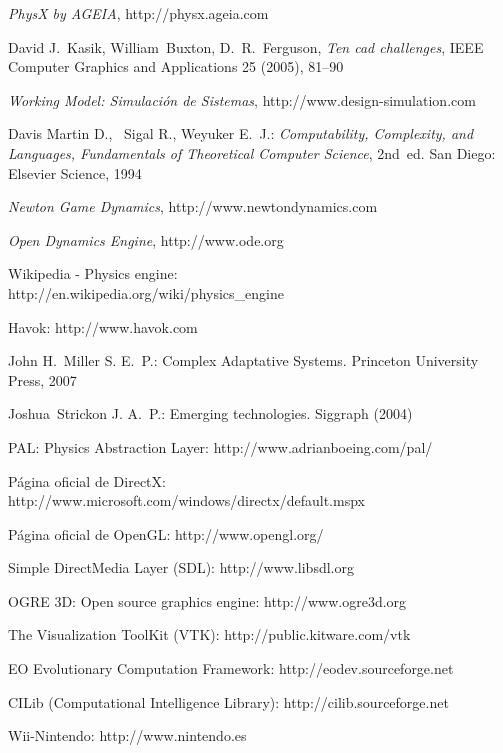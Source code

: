 \documentclass[10pt,journal,letterpaper,compsoc]{IEEEtran}
\begin{document}
\begin{thebibliography}{28}

\emph{PhysX by AGEIA},
http://physx.ageia.com

David J.~Kasik, William~Buxton, D.~R.~Ferguson,
\emph{Ten cad challenges},
IEEE Computer Graphics and Applications 25 (2005), 81--90

\emph{Working Model: Simulaci\'on de Sistemas},
http://www.design-simulation.com

Davis Martin D., ~Sigal R., Weyuker E.~J.:
\emph{Computability, Complexity, and Languages, Fundamentals of Theoretical Computer Science}, 2nd~ed.
San Diego: Elsevier Science, 1994

\emph{Newton Game Dynamics},
http://www.newtondynamics.com

\emph{Open Dynamics Engine},
http://www.ode.org

Wikipedia - Physics engine:\\
http://en.wikipedia.org/wiki/physics\_engine

Havok:
http://www.havok.com

John H.~Miller S. E.~P.:
Complex Adaptative Systems.
Princeton University Press, 2007

Joshua~Strickon J. A.~P.:
Emerging technologies.
Siggraph (2004)

PAL: Physics Abstraction Layer:
http://www.adrianboeing.com/pal/

Página oficial de DirectX:\\
http://www.microsoft.com/windows/directx/default.mspx

Página oficial de OpenGL:
http://www.opengl.org/

Simple DirectMedia Layer (SDL):
http://www.libsdl.org

OGRE 3D: Open source graphics engine:
http://www.ogre3d.org

The Visualization ToolKit (VTK):
http://public.kitware.com/vtk

EO Evolutionary Computation Framework:
http://eodev.sourceforge.net

CILib (Computational Intelligence Library):
http://cilib.sourceforge.net

Wii-Nintendo:
http://www.nintendo.es


\end{thebibliography}
\end{document}
